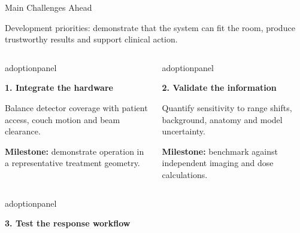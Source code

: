 \documentclass[aspectratio=169,11pt]{beamer}
\begin{document}
\begin{frame}{Main Challenges Ahead}

{\small Development priorities: demonstrate that the system can fit the room,
produce trustworthy results and support clinical action.\par}
\vspace{0.18cm}
\begin{columns}[T,onlytextwidth]
\begin{beamercolorbox}[sep=6pt,wd=\linewidth]{adoptionpanel}
\begin{minipage}[t][1.65cm][t]{\linewidth}\raggedright
{\footnotesize\bfseries\color{crBlue}1. Integrate the hardware\par}
\vspace{0.07cm}
{\scriptsize Balance detector coverage with patient access, couch motion and beam clearance.\par\vspace{0.08cm}\textbf{Milestone:} demonstrate operation in a representative treatment geometry.\par}
\end{minipage}
\end{beamercolorbox}
\begin{beamercolorbox}[sep=6pt,wd=\linewidth]{adoptionpanel}
\begin{minipage}[t][1.65cm][t]{\linewidth}\raggedright
{\footnotesize\bfseries\color{crBlue}2. Validate the information\par}
\vspace{0.07cm}
{\scriptsize Quantify sensitivity to range shifts, background, anatomy and model uncertainty.\par\vspace{0.08cm}\textbf{Milestone:} benchmark against independent imaging and dose calculations.\par}
\end{minipage}
\end{beamercolorbox}
\end{columns}
\par\vspace{0.22cm}
\begin{columns}[T,onlytextwidth]
\begin{beamercolorbox}[sep=6pt,wd=\linewidth]{adoptionpanel}
\begin{minipage}[t][1.65cm][t]{\linewidth}\raggedright
{\footnotesize\bfseries\color{crBlue}3. Test the response workflow\par}

\end{minipage}
\end{beamercolorbox}
\end{columns}
\end{frame}
\end{document}
